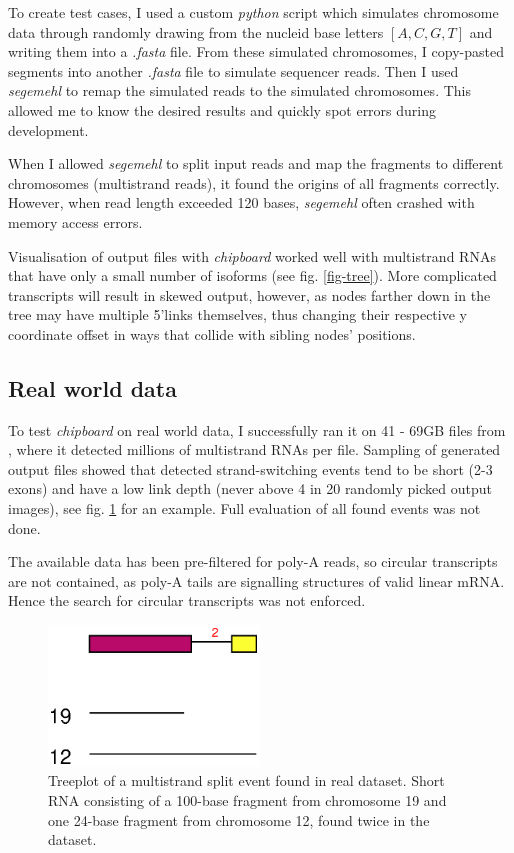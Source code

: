 \documentclass[11pt]{article}
\begin{document}
To create test cases, I used a custom \emph{python} script which simulates chromosome data through
randomly drawing from the nucleid base letters $[A,C,G,T]$ and writing them into a \emph{.fasta} file.
From these simulated chromosomes, I copy-pasted segments into another \emph{.fasta} file to simulate
sequencer reads. Then I used \emph{segemehl} to remap the simulated reads to the simulated chromosomes.
This allowed me to know the desired results and quickly spot errors during development.

When I allowed \emph{segemehl} to split input reads and map the fragments to different chromosomes 
(multistrand reads), it found the origins of all fragments correctly. However, when read length
exceeded 120 bases, \emph{segemehl} often crashed with memory access errors.

Visualisation of output files with \emph{chipboard} worked well with multistrand RNAs that have only 
a small number of isoforms (see fig. \ref{fig-tree}).
More complicated transcripts will result in skewed output, however, as nodes farther down in the
tree may have multiple 5'links themselves, thus changing their respective y coordinate offset in
ways that collide with sibling nodes' positions.


\subsection{Real world data}
\label{sec-3-2}
\label{txt:data}

To test \emph{chipboard} on real world data, I successfully ran it on 41 - 69GB files from 
\cite{skinpaper}, where it detected millions of multistrand RNAs per file. Sampling of generated
output files showed that detected strand-switching events tend to be short (2-3 exons) and have a
low link depth (never above 4 in 20 randomly picked output images), see fig. \ref{fig-tree2} for 
an example. Full evaluation of all found events was not done.

The available data has been pre-filtered for poly-A reads, so circular transcripts are not 
contained, as poly-A tails are signalling structures of valid linear mRNA.
Hence the search for circular transcripts was not enforced.

\begin{figure}
\centering
\includegraphics[width=0.5\textwidth]{./real.eps}
\caption[Multistrand tree plot of real data]{Treeplot of a multistrand split event found in real dataset. Short RNA consisting of a 100-base fragment from chromosome 19 and one 24-base fragment from chromosome 12, found twice in the dataset.}\label{fig-tree2}
\end{figure}
\end{document}

